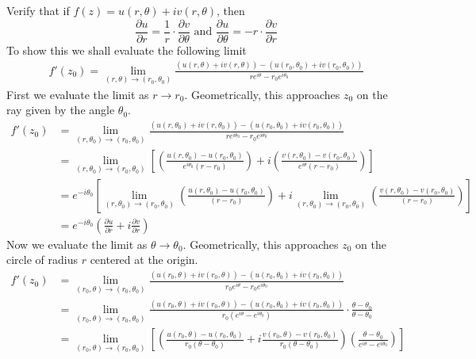 \documentclass[12pt]{article}
\newenvironment{problem}[2][Problem]{\begin{trivlist}
\item[\hskip \labelsep {\bfseries #1} \hskip \labelsep {\bfseries #2.}]}{\end{trivlist}}
\begin{document}
\begin{problem}{2}
	Verify that if $f(z) = u(r,\theta) + iv(r,\theta)$, then
	\[
		\frac{\partial u}{\partial r} = \frac{1}{r} \cdot \frac{\partial v}{\partial \theta} \text{ and } \frac{\partial u}{\partial \theta} = -r \cdot \frac{\partial v}{\partial r}
	\]
	To show this we shall evaluate the following limit
	\begin{align*}
		f'(z_0) = \lim_{(r,\theta) \to (r_0,\theta_0)} \frac{(u(r,\theta) + iv(r,\theta)) - (u(r_0,\theta_0) + iv(r_0,\theta_0))}{re^{i\theta} - r_0e^{i\theta_0}}
	\end{align*}
	First we evaluate the limit as $r \to r_0$. Geometrically, this approaches $z_0$ on the ray given by the angle $\theta_0$.
	\begin{align*}
		f'(z_0) &= \lim_{(r,\theta_0) \to (r_0,\theta_0)} \frac{(u(r,\theta_0) + iv(r,\theta_0)) - (u(r_0,\theta_0) + iv(r_0,\theta_0))}{re^{i\theta_0} - r_0e^{i\theta_0}} \\
			&= \lim_{(r,\theta_0) \to (r_0,\theta_0)} \left[\left(\frac{u(r,\theta_0) - u(r_0,\theta_0)}{e^{i\theta_0}(r - r_0)}\right) + i\left(\frac{v(r,\theta_0) - v(r_0,\theta_0)}{e^{i\theta}(r - r_0)}\right)\right] \\
			&= e^{-i\theta_0}\left[\lim_{(r,\theta_0) \to (r_0,\theta_0)} \left(\frac{u(r,\theta_0) - u(r_0,\theta_0)}{(r - r_0)}\right) + i\lim_{(r,\theta_0) \to (r_0,\theta_0)} \left(\frac{v(r,\theta_0) - v(r_0,\theta_0)}{(r - r_0)}\right)\right] \\ 
			&= e^{-i\theta_0}\left(\frac{\partial u}{\partial r} + i\frac{\partial v}{\partial r}\right)
	\end{align*}
	Now we evaluate the limit as $\theta \to \theta_0$. Geometrically, this approaches $z_0$ on the circle of radius $r$ centered at the origin.
	\begin{align*}
		f'(z_0) &= \lim_{(r_0,\theta) \to (r_0,\theta_0)} \frac{(u(r_0,\theta) + iv(r_0,\theta)) - (u(r_0,\theta_0) + iv(r_0,\theta_0))}{r_0e^{i\theta} - r_0e^{i\theta_0}} \\
			&= \lim_{(r_0,\theta) \to (r_0,\theta_0)} \frac{(u(r_0,\theta) + iv(r_0,\theta)) - (u(r_0,\theta_0) + iv(r_0,\theta_0))}{r_0(e^{i\theta} - e^{i\theta_0})} \cdot \frac{\theta - \theta_0}{\theta - \theta_0} \\
			&= \lim_{(r_0,\theta) \to (r_0,\theta_0)} \left[\left(\frac{u(r_0,\theta) - u(r_0,\theta_0)}{r_0(\theta - \theta_0)} + i\frac{v(r_0,\theta) - v(r_0,\theta_0)}{r_0(\theta - \theta_0)}\right)\left(\frac{\theta - \theta_0}{e^{i\theta} - e^{i\theta_0}}\right)\right] \\

\end{align*}
\end{problem}
\end{document}
